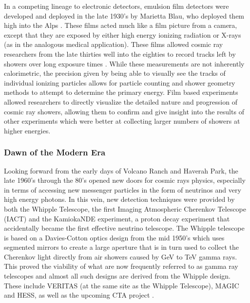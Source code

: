 In a competing lineage to electronic detectors, emulsion film detectors were developed and deployed in the late 1930's by Marietta Blau, who deployed them high into the Alps \cite{ultraray_blau}. These films acted much like a film picture from a camera, except that they are exposed by either high energy ionizing radiation or X-rays (as in the analogous medical application). These films allowed cosmic ray researchers from the late thirties well into the eighties to record tracks left by showers over long exposure times \cite{crapp}. While these measurements are not inherently calorimetric, the precision given by being able to visually see the tracks of individual ionizing particles allows for particle counting and shower geometry methods to attempt to determine the primary energy. Film based experiments allowed researchers to directly visualize the detailed nature and progression of cosmic ray showers, allowing them to confirm and give insight into the results of other experiments which were better at collecting larger numbers of showers at higher energies.

\subsubsection*{Dawn of the Modern Era}

Looking forward from the early days of Volcano Ranch and Haverah Park, the late 1960's through the 80's opened new doors for cosmic rays physics, especially in terms of accessing new messenger particles in the form of neutrinos and very high energy photons. In this vein, new detection techniques were provided by both the Whipple Telescope, the first Imaging Atmospheric Cherenkov Telescope (IACT) and the KamiokaNDE experiment, a proton decay experiment that accidentally became the first effective neutrino telescope. The Whipple telescope is based on a Davies-Cotton optics design from the mid 1950's which uses segmented mirrors to create a large aperture that is in turn used to collect the Cherenkov light directly from air showers caused by GeV to TeV gamma rays. This proved the viability of what are now frequently referred to as gamma ray telescopes and almost all such designs are derived from the Whipple design. These include VERITAS (at the same site as the Whipple Telescope), MAGIC and HESS, as well as the upcoming CTA project \cite{ultraray}.  

